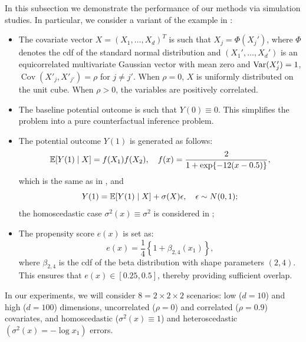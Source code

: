 In this subsection we demonstrate the performance of our methods via
simulation studies. In particular, we consider a variant of the
example in \cite{wager2018estimation}:
\begin{itemize}
\item The covariate vector $X = (X_{1}, \ldots, X_{d})^{T}$ is such
  that $X_{j} = \Phi(X_{j}')$, where $\Phi$ denotes the cdf of the
  standard normal distribution and $(X_{1}', \ldots, X_{d}')$ is an
  equicorrelated multivariate Gaussian vector with mean zero and
  $\mathrm{Var}(X'_j) = 1$, $\operatorname{Cov}(X'_j, X'_{j'}) = \rho$ for $j \neq j'$.   
  When $\rho = 0$, $X$ is uniformly distributed on the unit
  cube. When $\rho > 0$, the variables are positively correlated.
\item The baseline potential outcome is such that $Y(0)\equiv 0$. This
  simplifies the problem into a pure counterfactual inference problem.
  \item The potential outcome $Y(1)$ is generated as follows:
    \[\mathbb{E}[Y(1) \mid X] = f(X_{1})f(X_{2}),\quad  f(x) = \frac{2}{1 + \exp\{-12(x - 0.5)\}},\]
    which is the same as in \cite{wager2018estimation}, and
    \[Y(1) = \mathbb{E}[Y(1) \mid X] + \sigma(X)\epsilon, \quad \epsilon \sim N(0,
    1);\]
    the homoscedastic case $\sigma^{2}(x)\equiv \sigma^{2}$ is
    considered in \cite{wager2018estimation};
  \item The propensity score $e(x)$ is set as:
    \[e(x) = \frac{1}{4}\left\{ 1 + \beta_{2, 4}(x_{1})\right\},\]
    where $\beta_{2, 4}$ is the cdf of the beta
    distribution with shape parameters $(2, 4)$. This ensures that
    $e(x)\in [0.25, 0.5]$, thereby providing sufficient overlap.
  \end{itemize}
  In our experiments, we will consider $8 = 2\times 2 \times 2$
  scenarios: low ($d = 10$) and high ($d = 100$) dimensions,
  uncorrelated ($\rho = 0$) and correlated ($\rho = 0.9$) covariates,
  and homoscedastic ($\sigma^{2}(x) \equiv 1$) and heteroscedastic
  $(\sigma^{2}(x) = -\log x_{1})$ errors.

